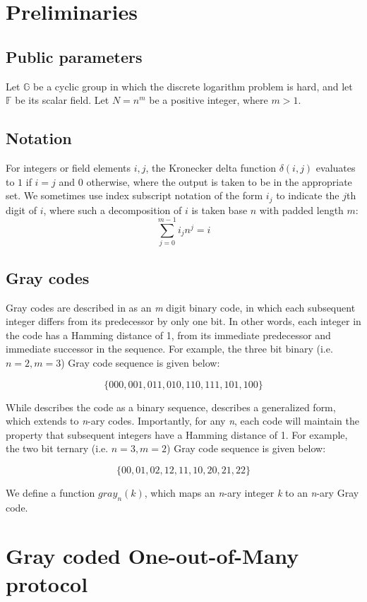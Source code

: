 \documentclass{article}
\begin{document}
\section{Preliminaries}
\subsection{Public parameters}
Let $\mathbb{G}$ be a cyclic group in which the discrete logarithm problem is hard, and let $\mathbb{F}$ be its scalar field.
Let $N = n^m$ be a positive integer, where $m > 1$.


\subsection{Notation}
For integers or field elements $i,j$, the Kronecker delta function $\delta(i,j)$ evaluates to $1$ if $i=j$ and $0$ otherwise, where the output is taken to be in the appropriate set. We sometimes use index subscript notation of the form $i_j$ to indicate the $j$th digit of $i$, where such a decomposition of $i$ is taken base $n$ with padded length $m$:
$$\sum_{j=0}^{m-1} i_j n^j = i$$


\subsection{Gray codes}
Gray codes are described in \cite{gray} as an \emph{m} digit binary code, in which each subsequent integer differs from its predecessor by only one bit. In other words, each integer in the code has a Hamming distance of 1, from its immediate predecessor and immediate successor in the sequence. For example, the three bit binary (i.e. $n = 2, m = 3$) Gray code sequence is given below:
\begin{center}
$$\{000, 001, 011, 010, 110, 111, 101, 100\}$$
\end{center}
While \cite{gray} describes the code as a binary sequence, \cite{guan} describes a generalized form, which extends to \emph{n}-ary codes. Importantly, for any \emph{n}, each code will maintain the property that subsequent integers have a Hamming distance of 1. For example, the two bit ternary (i.e. $n = 3, m = 2$) Gray code sequence is given below:
\begin{center}
$$\{00, 01, 02, 12, 11, 10, 20, 21, 22\}$$
\end{center}
We define a function $gray_n(k)$, which maps an \emph{n}-ary integer \emph{k} to an \emph{n}-ary Gray code.


\section{Gray coded One-out-of-Many protocol}
\end{document}

